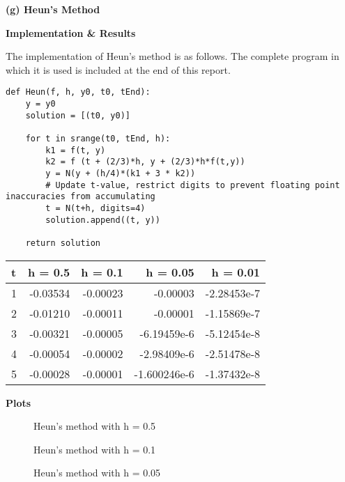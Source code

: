 \documentclass[a4paper,11pt]{article}
\begin{document}
\textbf{(g) Heun's Method}

\textbf{Implementation \& Results}

The implementation of Heun's method is as follows. The complete program in which it is used is included at the end of this report.
\begin{verbatim}
def Heun(f, h, y0, t0, tEnd):
    y = y0
    solution = [(t0, y0)]
    
    for t in srange(t0, tEnd, h):
        k1 = f(t, y)
        k2 = f (t + (2/3)*h, y + (2/3)*h*f(t,y))
        y = N(y + (h/4)*(k1 + 3 * k2))
        # Update t-value, restrict digits to prevent floating point inaccuracies from accumulating
        t = N(t+h, digits=4)
        solution.append((t, y))
        
    return solution
\end{verbatim}

\begin{center}
\begin{tabular}{|l|r|r|r|r|}
\hline
t & h = 0.5 & h = 0.1 & h = 0.05 & h = 0.01\\
\hline
1 & -0.03534 & -0.00023 & -0.00003 & -2.28453e-7\\
2 & -0.01210 & -0.00011 & -0.00001 & -1.15869e-7\\
3 & -0.00321 & -0.00005 & -6.19459e-6 & -5.12454e-8\\
4 & -0.00054 & -0.00002 & -2.98409e-6 & -2.51478e-8\\
5 & -0.00028 & -0.00001 & -1.600246e-6 & -1.37432e-8\\
\hline 
\end{tabular}
\end{center}

\textbf{Plots}

\begin{figure}[H]
\caption{Heun's method with h = 0.5}\label{figH0.5}
\end{figure}

\begin{figure}[H]
\caption{Heun's method  with h = 0.1}\label{figH0.1}
\end{figure}

\begin{figure}[H]
\caption{Heun's method with h = 0.05}\label{figH0.05}
\end{figure}
\end{document}
